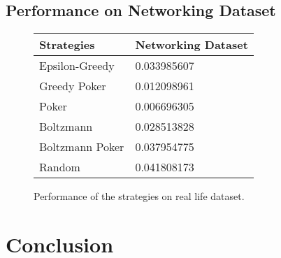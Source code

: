 \documentclass[12pt]{article}
\begin{document}
\subsection{Performance on Networking Dataset}

\begin{figure}
\begin{center}
    \begin{tabular}{| l | l |}
    \hline
    Strategies & Networking Dataset \\ \hline
    Epsilon-Greedy & 0.033985607\\ \hline
    Greedy Poker & 0.012098961 \\ \hline
    Poker & 0.006696305 \\ \hline
    Boltzmann & 0.028513828 \\ \hline
    Boltzmann Poker & 0.037954775 \\ \hline 
    Random & 0.041808173 \\ \hline
    \hline
    \end{tabular}
\end{center}  
\caption{Performance of the strategies on real life dataset.}
\end{figure}

\section{Conclusion}





\end{document}
